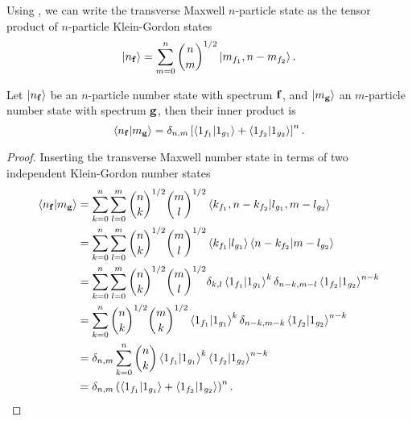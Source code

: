 \begin{corollary}
	Using , we can write the transverse Maxwell $n$-particle state as the tensor product of $n$-particle Klein-Gordon states
	\begin{equation}
		\ket{n_{\vb{f}}}
		=
		\sum^n_{m=0}
		\binom{n}{m}^{1/2}
		\ket{m_{f_1},n-m_{f_2}}
		.
	\end{equation}
\end{corollary}

\begin{lemma}\label{thm:qmw_qkg_number_state_inner_product}
	Let $\ket{n_{\vb{f}}}$ be an $n$-particle number state with spectrum $\vb{f}$, and $\ket{m_{\vb{g}}}$ an $m$-particle number state with spectrum $\vb{g}$, then their inner product is
	\begin{equation}
		\braket{n_{\vb{f}}}{m_{\vb{g}}}
		=
		\delta_{n,m}
		\left[
			\braket{1_{f_1}}{1_{g_1}}
			+
			\braket{1_{f_2}}{1_{g_2}}
		\right]^n
		.
	\end{equation}
\end{lemma}
\begin{proof}
	Inserting the transverse Maxwell number state in terms of two independent Klein-Gordon number states 
	\begin{equation*}
		\begin{split}
			\braket{n_{\vb{f}}}{m_{\vb{g}}}
			&=
			\sum^n_{k=0}
			\sum^m_{l=0}
			\binom{n}{k}^{1/2}
			\binom{m}{l}^{1/2}
			\braket{k_{f_1},n-k_{f_2}}{l_{g_1},m-l_{g_2}}
			\\
			&=
			\sum^n_{k=0}
			\sum^m_{l=0}
			\binom{n}{k}^{1/2}
			\binom{m}{l}^{1/2}
			\braket{k_{f_1}}{l_{g_1}}
			\braket{n-k_{f_2}}{m-l_{g_2}}
			\\
			&=
			\sum^n_{k=0}
			\sum^m_{l=0}
			\binom{n}{k}^{1/2}
			\binom{m}{l}^{1/2}
			\delta_{k,l}
			\braket{1_{f_1}}{1_{g_1}}^k
			\delta_{n-k,m-l}
			\braket{1_{f_2}}{1_{g_2}}^{n-k}
			\\
			&=
			\sum^n_{k=0}
			\binom{n}{k}^{1/2}
			\binom{m}{k}^{1/2}
			\braket{1_{f_1}}{1_{g_1}}^k
			\delta_{n-k,m-k}
			\braket{1_{f_2}}{1_{g_2}}^{n-k}
			\\
			&=
			\delta_{n,m}
			\sum^n_{k=0}
			\binom{n}{k}
			\braket{1_{f_1}}{1_{g_1}}^k
			\braket{1_{f_2}}{1_{g_2}}^{n-k}
			\\
			&=
			\delta_{n,m}
			\left(
				\braket{1_{f_1}}{1_{g_1}}
				+
				\braket{1_{f_2}}{1_{g_2}}
			\right)^n
			.
		\end{split}
	\end{equation*}
\end{proof}

